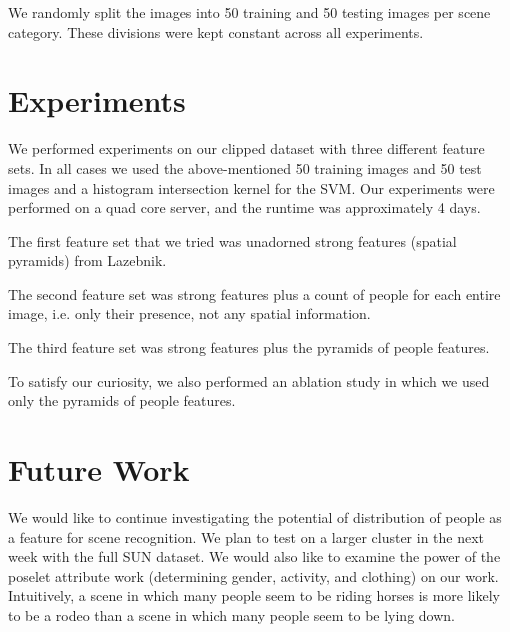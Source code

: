 \documentclass[11pt]{article}
\begin{document}
We randomly split the images into 50 training and 50 testing images per scene category.  These divisions were kept constant across all experiments.






\section{Experiments}
We performed experiments on our clipped dataset with three different feature sets.  In all cases we used the above-mentioned 50 training images and 50 test images and a histogram intersection kernel for the SVM.  Our experiments were performed on a quad core server, and the runtime was approximately 4 days.

The first feature set that we tried was unadorned strong features (spatial pyramids) from Lazebnik.

The second feature set was strong features plus a count of people for each entire image, i.e. only their presence, not any spatial information.

The third feature set was strong features plus the pyramids of people features.

To satisfy our curiosity, we also performed an ablation study in which we used only the pyramids of people features.

\section{Future Work}
We would like to continue investigating the potential of distribution of people as a feature for scene recognition.  We plan to test on a larger cluster in the next week with the full SUN dataset.  We would also like to examine the power of the poselet attribute work (determining gender, activity, and clothing) on our work.  Intuitively, a scene in which many people seem to be riding horses is more likely to be a rodeo than a scene in which many people seem to be lying down.



\end{document}
